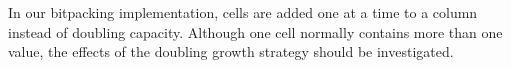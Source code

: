 In our bitpacking implementation, cells are added one at a time to a column instead of doubling capacity. Although one cell normally contains more than one value, the effects of the doubling growth strategy should be investigated.


